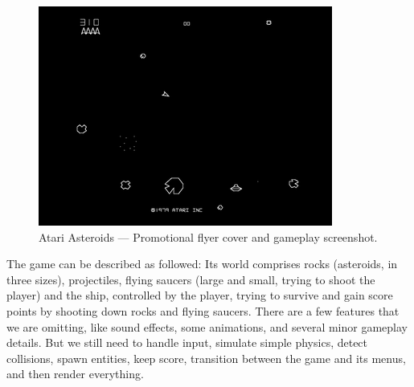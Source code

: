 \documentclass[
  digital, %
  color,   %
  table,   %
  oneside, %
  lof,     %
  lot,     %
]{fithesis3}
\begin{document}
\begin{figure}
\begin{minipage}{0.33\textwidth}
    \end{minipage}
    \hfill
    \begin{minipage}{0.66\textwidth}
        \hfill \includegraphics[height=0.65\textwidth]{images/atariasteroids-screenshot.png}
    \end{minipage}
    \caption{Atari Asteroids --- Promotional flyer cover\cite{asteroidsflyer}
    and gameplay screenshot.\cite{asteroidsscreenshot}}
\end{figure}

The game can be described as followed:
\cite{aboutasteroids}
Its world comprises rocks (asteroids, in three sizes), projectiles,
flying saucers (large and small, trying to shoot the player) and the ship, controlled by the player,
trying to survive and gain score points by shooting down rocks and flying saucers.
There are a few features that we are omitting, like sound effects, some animations,
and several minor gameplay details. But we still need to handle input, simulate simple physics,
detect collisions, spawn entities, keep score, transition between the game
and its menus, and then render everything.



\end{document}
